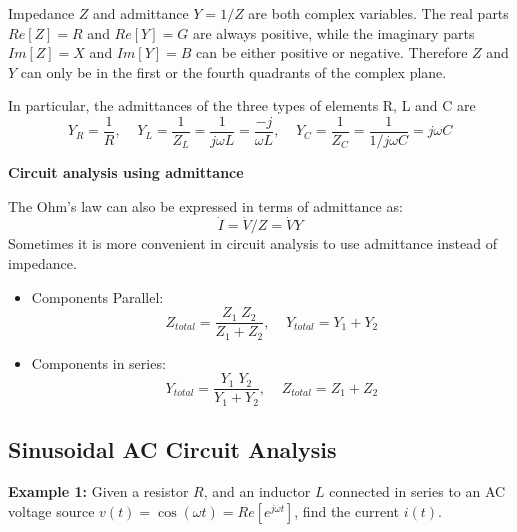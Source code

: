 Impedance $Z$ and admittance $Y=1/Z$ are both complex variables. The 
real parts $Re[Z]=R$ and $Re[Y]=G$ are always positive, while the
imaginary parts $Im[Z]=X$ and $Im[Y]=B$ can be either positive or
negative. Therefore $Z$ and $Y$ can only be in the first or the 
fourth quadrants of the complex plane.

In particular, the admittances of the three types of elements R, L
and C are
\[ Y_R=\frac{1}{R},\;\;\;\;
Y_L=\frac{1}{Z_L}=\frac{1}{j\omega L}=\frac{-j}{\omega L},\;\;\;\;
Y_C=\frac{1}{Z_C}=\frac{1}{1/j\omega C}=j\omega C	\]

{\bf Circuit analysis using admittance}

The Ohm's law can also be expressed in terms of admittance as:
\[	\dot{I}=\dot{V}/Z=\dot{V}Y	\]
Sometimes it is more convenient in circuit analysis to use admittance
instead of impedance.
\begin{itemize}
\item Components Parallel:
\[ Z_{total}=\frac{Z_1\;Z_2}{Z_1+Z_2},\;\;\;\;Y_{total}=Y_1+Y_2 \]
\item Components in series:
\[ Y_{total}=\frac{Y_1\;Y_2}{Y_1+Y_2},\;\;\;\;Z_{total}=Z_1+Z_2 \]
\end{itemize}

\subsection*{Sinusoidal AC Circuit Analysis}

{\bf Example 1:} Given a resistor $R$, and an inductor $L$ connected in 
series to an AC voltage source $v(t)=\cos(\omega t)=Re[e^{j\omega t}]$, 
find the current $i(t)$.

